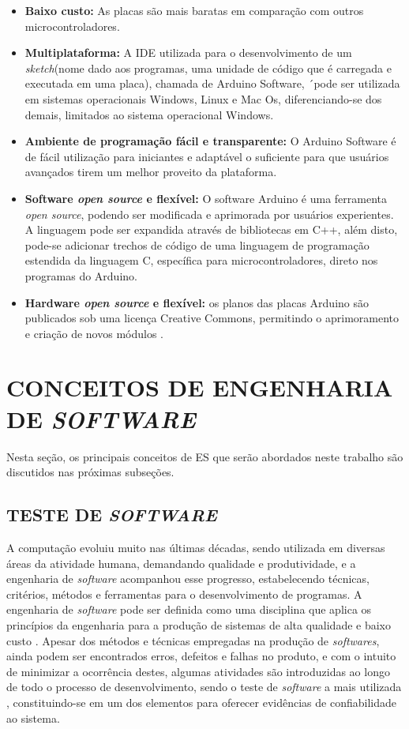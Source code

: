 \begin{itemize}
    \item \textbf{Baixo custo:} As placas são mais baratas em comparação com outros microcontroladores.
    \item \textbf{Multiplataforma:} A IDE utilizada para o desenvolvimento de um \textit{sketch}(nome dado aos programas, uma unidade de código que é carregada e executada em uma placa), chamada de Arduino Software, ´pode ser utilizada em sistemas operacionais Windows, Linux e Mac Os, diferenciando-se dos demais, limitados ao sistema operacional Windows.
    \item \textbf{ Ambiente de programação fácil e transparente:} O Arduino Software é de fácil utilização para iniciantes e adaptável o suficiente para que usuários avançados tirem um melhor proveito da plataforma.
    \item \textbf{Software \textit{open source} e flexível:} O software Arduino é uma ferramenta \textit{open source}, podendo ser modificada e aprimorada por usuários experientes. A linguagem pode ser expandida através de bibliotecas em C++, além disto, pode-se adicionar trechos de código de uma linguagem de programação estendida da linguagem C, específica para microcontroladores, direto nos programas do Arduino.
    
    \item \textbf{Hardware \textit{open source} e flexível:} os planos das placas Arduino são publicados sob uma licença Creative Commons, permitindo o aprimoramento e criação de novos módulos \cite{arduino2018}.
\end{itemize}


\section{CONCEITOS DE ENGENHARIA DE \textit{SOFTWARE}}
\label{sec:engenhariaDeSoftware}
Nesta seção, os principais conceitos de ES que serão abordados neste trabalho são discutidos nas próximas subseções.

\subsection{TESTE DE \textit{SOFTWARE}}
\label{subsec:testeDeSoftware} A computação evoluiu muito nas últimas décadas, sendo utilizada em diversas áreas da atividade humana, demandando qualidade e produtividade, e a engenharia de \textit{software} acompanhou esse progresso, estabelecendo técnicas, critérios, métodos e ferramentas para o desenvolvimento de programas. A engenharia de \textit{software} pode ser definida como uma disciplina que aplica os princípios da engenharia para a produção de sistemas de alta qualidade e baixo custo \cite{Pressman2011}. Apesar dos métodos e técnicas empregadas na produção de \textit{softwares}, ainda podem ser encontrados erros, defeitos e falhas no produto, e com o intuito de minimizar a ocorrência destes, algumas atividades são introduzidas ao longo de todo o processo de desenvolvimento, sendo o teste de \textit{software} a mais utilizada \cite{Maldonado1997}, constituindo-se em um dos elementos para oferecer evidências de confiabilidade ao sistema.

